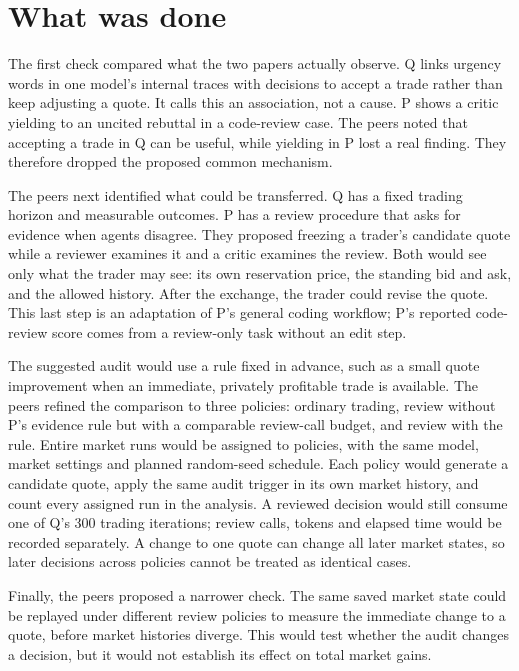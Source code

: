 \documentclass{article}
\begin{document}
\section{What was done}

The first check compared what the two papers actually observe. Q links urgency words in one model's
internal traces with decisions to accept a trade rather than keep adjusting a quote. It calls this
an association, not a cause. P shows a critic yielding to an uncited rebuttal in a code-review case.
The peers noted that accepting a trade in Q can be useful, while yielding in P lost a real finding.
They therefore dropped the proposed common mechanism.

The peers next identified what could be transferred. Q has a fixed trading horizon and measurable
outcomes. P has a review procedure that asks for evidence when agents disagree. They proposed
freezing a trader's candidate quote while a reviewer examines it and a critic examines the review.
Both would see only what the trader may see: its own reservation price, the standing bid and ask,
and the allowed history. After the exchange, the trader could revise the quote. This last step is an
adaptation of P's general coding workflow; P's reported code-review score comes from a review-only
task without an edit step.

The suggested audit would use a rule fixed in advance, such as a small quote improvement when an
immediate, privately profitable trade is available. The peers refined the comparison to three
policies: ordinary trading, review without P's evidence rule but with a comparable review-call
budget, and review with the rule. Entire market runs would be assigned to policies, with the same
model, market settings and planned random-seed schedule. Each policy would generate a candidate
quote, apply the same audit trigger in its own market history, and count every assigned run in the
analysis. A reviewed decision would still consume one of Q's 300 trading iterations; review calls,
tokens and elapsed time would be recorded separately. A change to one quote can change all later
market states, so later decisions across policies cannot be treated as identical cases.

Finally, the peers proposed a narrower check. The same saved market state could be replayed under
different review policies to measure the immediate change to a quote, before market histories
diverge. This would test whether the audit changes a decision, but it would not establish its effect
on total market gains.
\end{document}
